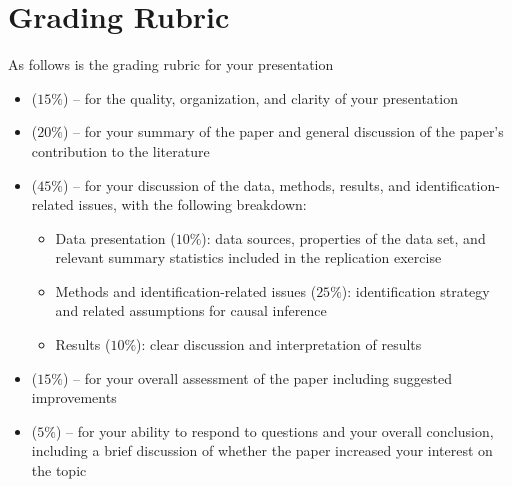 \documentclass[letterpaper,12pt]{article}
\begin{document}
\section*{Grading Rubric}
As follows is the grading rubric for your presentation
\begin{itemize}

\item ($15\%$) -- for the quality, organization, and clarity of your presentation

\item ($20\%$) -- for your summary of the paper and general discussion of the paper's contribution to the literature

\item ($45\%$) -- for your discussion of the data, methods, results, and identification-related issues, with the following breakdown:
\begin{itemize}
\item Data presentation ($10\%$): data sources, properties of the data set, and relevant summary statistics included in the replication exercise
\item Methods and identification-related issues ($25\%$): identification strategy and related assumptions for causal inference
\item Results ($10\%$): clear discussion and interpretation of results
\end{itemize}

\item ($15\%$) -- for your overall assessment of the paper including suggested improvements

\item ($5\%$) -- for your ability to respond to questions and your overall conclusion, including a brief discussion of whether the paper increased your interest on the topic

\end{itemize}
\end{document}
